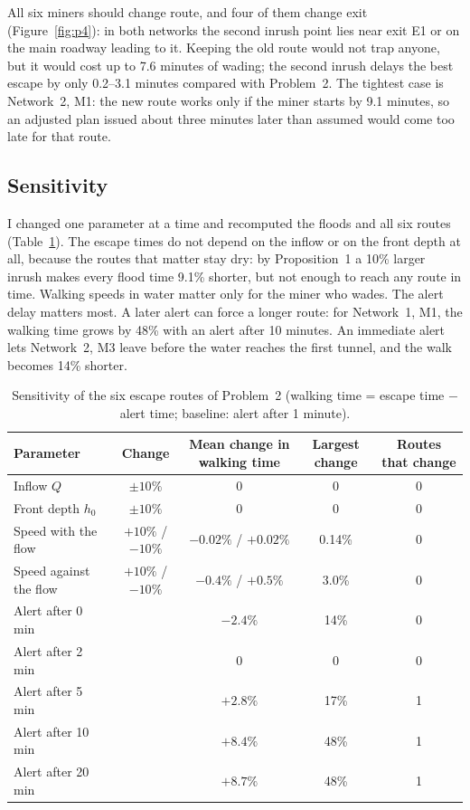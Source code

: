 \documentclass[11pt,a4paper]{article}
\theoremstyle{remark}
\begin{document}
All six miners should change route, and four of them change exit (Figure~\ref{fig:p4}): in both networks the second inrush point lies near exit E1 or on the main roadway leading to it. Keeping the old route would not trap anyone, but it would cost up to 7.6 minutes of wading; the second inrush delays the best escape by only 0.2--3.1 minutes compared with Problem~2. The tightest case is Network~2, M1: the new route works only if the miner starts by 9.1 minutes, so an adjusted plan issued about three minutes later than assumed would come too late for that route.

\subsection{Sensitivity}

I changed one parameter at a time and recomputed the floods and all six routes (Table~\ref{tab:sens}). The escape times do not depend on the inflow or on the front depth at all, because the routes that matter stay dry: by Proposition~1 a 10\% larger inrush makes every flood time 9.1\% shorter, but not enough to reach any route in time. Walking speeds in water matter only for the miner who wades. The alert delay matters most. A later alert can force a longer route: for Network~1, M1, the walking time grows by 48\% with an alert after 10 minutes. An immediate alert lets Network~2, M3 leave before the water reaches the first tunnel, and the walk becomes 14\% shorter.

\begin{table}[htbp]
  \centering\small
  \begin{tabular}{@{}l c c c c@{}}
    \toprule
    Parameter & Change & Mean change in walking time & Largest change & Routes that change\\
    \midrule
    Inflow $Q$           & $\pm10\%$ & 0 & 0 & 0\\
    Front depth $h_0$    & $\pm10\%$ & 0 & 0 & 0\\
    Speed with the flow  & $+10\%$ / $-10\%$ & $-0.02\%$ / $+0.02\%$ & 0.14\% & 0\\
    Speed against the flow & $+10\%$ / $-10\%$ & $-0.4\%$ / $+0.5\%$ & 3.0\% & 0\\
    \midrule
    Alert after 0 min    & & $-2.4\%$ & 14\% & 0\\
    Alert after 2 min    & & 0 & 0 & 0\\
    Alert after 5 min    & & $+2.8\%$ & 17\% & 1\\
    Alert after 10 min   & & $+8.4\%$ & 48\% & 1\\
    Alert after 20 min   & & $+8.7\%$ & 48\% & 1\\
    \bottomrule
  \end{tabular}
  \caption{Sensitivity of the six escape routes of Problem~2 (walking time = escape time $-$ alert time; baseline: alert after 1 minute).}
  \label{tab:sens}
\end{table}
\end{document}

